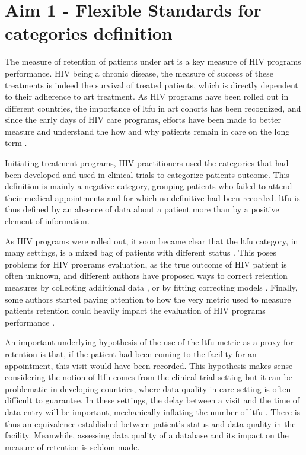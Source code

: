 \section[Flexible Standards]{Aim 1 - Flexible Standards for categories definition}

The measure of retention of patients under \gls{art} is a key measure of HIV programs performance. HIV being a chronic disease, the measure of success of these treatments is indeed the survival of treated patients, which is directly dependent to their adherence to \gls{art} treatment. As HIV programs have been rolled out in different countries, the importance of \gls{ltfu} in \gls{art} cohorts has been recognized, and since the early days of HIV care programs, efforts have been made to better measure and understand the how and why patients remain in care on the long term   \citep{ioannidis_predictors_1999,lebouche_incidence_2006,moh_incidence_2007}.

Initiating treatment programs, HIV practitioners used the categories that had been developed and used in clinical trials to categorize patients outcome. This definition is mainly a negative category, grouping patients who failed to attend their medical appointments and for which no definitive had been recorded. \gls{ltfu} is thus defined by an absence of data about a patient more than by a positive element of information.

As HIV programs were rolled out, it soon became clear that the \gls{ltfu} category, in many settings, is a mixed bag of patients with different status \citep{kwong-leung_yu_true_2007,dalal_characteristics_2008,mcguire_vital_2010}. This poses problems for HIV programs evaluation, as the true outcome of HIV patient is often unknown, and different authors have proposed ways to correct retention measures by collecting additional data
 \citep{yiannoutsos_sampling-based_2008,geng_tracking_2010,tassie_evaluation_2010}, or by fitting correcting models \citep{brinkhof_adjusting_2010,egger_correcting_2011,van_cutsem_correcting_2011,henriques_comparison_2012,verguet_incorporating_2013}.
Finally, some authors started paying attention to how the very metric used to measure patients retention could heavily impact the evaluation of HIV programs performance \citep{chi_empirical_2010,chi_universal_2011,fox_defining_2012,mugavero_measuring_2012,yehia_comparing_2012,grimsrud_impact_2013,shepherd_impact_2013}.

An important underlying hypothesis of the use of the \gls{ltfu} metric as a proxy for retention is that, if the patient had been coming to the facility for an appointment, this visit would have been recorded. This hypothesis makes sense considering the notion of \gls{ltfu} comes from the clinical trial setting \citep{lebouche_incidence_2006} but it can be problematic in developing countries, where data quality in care setting is often difficult to guarantee. In these settings, the delay between a visit and the time of data entry will be important, mechanically inflating the number of \gls{ltfu} \citep{lurton_report_2012}. There is thus an equivalence established between patient's status and data quality in the facility. Meanwhile, assessing data quality of a database and its impact on the measure of retention is seldom made.

